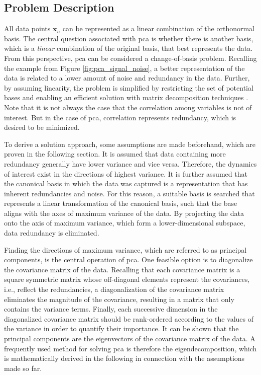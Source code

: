 \documentclass[../../../main.tex]{subfiles}
\begin{document}
\subsection{Problem Description}

All data points $\bm{x}_n$ can be represented as a linear combination of the orthonormal basis. The central question associated with \gls{pca} is whether there is another basis, which is a \textit{linear} combination of the original basis, that best represents the data. From this perspective, \gls{pca} can be considered a change-of-basis problem. Recalling the example from Figure \ref{fig:pca_signal_noise}, a better representation of the data is related to a lower amount of noise and redundancy in the data. Further, by assuming linearity, the problem is simplified by restricting the set of potential bases and enabling an efficient solution with matrix decomposition techniques \cite{shl_2014}. Note that it is not always the case that the correlation among variables is not of interest. But in the case of \gls{pca}, correlation represents redundancy, which is desired to be minimized.

To derive a solution approach, some assumptions are made beforehand, which are proven in the following section. It is assumed that data containing more redundancy generally have lower variance and vice versa. Therefore, the dynamics of interest exist in the directions of highest variance. It is further assumed that the canonical basis in which the data was captured is a representation that has inherent redundancies and noise. For this reason, a suitable basis is searched that represents a linear transformation of the canonical basis, such that the base aligns with the axes of maximum variance of the data. By projecting the data onto the axis of maximum variance, which form a lower-dimensional subspace, data redundancy is eliminated.

Finding the directions of maximum variance, which are referred to as principal components, is the central operation of \gls{pca}. One feasible option is to diagonalize the covariance matrix of the data. Recalling that each covariance matrix is a square symmetric matrix whose off-diagonal elements represent the covariances, i.e., reflect the redundancies, a diagonalization of the covariance matrix eliminates the magnitude of the covariance, resulting in a matrix that only contains the variance terms. Finally, each successive dimension in the diagonalized covariance matrix should be rank-ordered according to the values of the variance in order to quantify their importance. It can be shown that the principal components are the eigenvectors of the covariance matrix of the data. A frequently used method for solving \acrshort{pca} is therefore the eigendecomposition, which is mathematically derived in the following in connection with the assumptions made so far.
\end{document}
